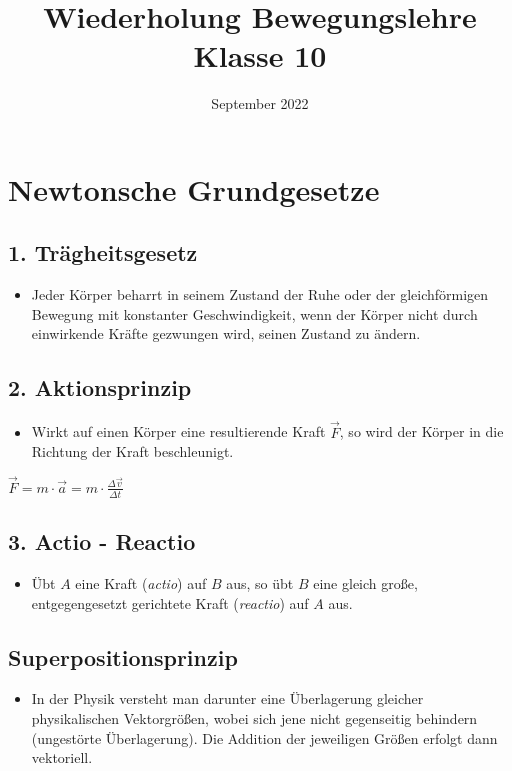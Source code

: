 \documentclass{article}
\title{Wiederholung Bewegungslehre Klasse 10}
\author{September 2022}
\date{}
\begin{document}
\maketitle
\section*{Newtonsche Grundgesetze}
\subsection*{1. Trägheitsgesetz}
\begin{itemize}
	\item Jeder Körper beharrt in seinem Zustand der Ruhe oder der gleichförmigen Bewegung mit konstanter Geschwindigkeit, wenn der Körper nicht durch einwirkende Kräfte gezwungen wird, seinen Zustand zu ändern.	
\end{itemize}
\subsection*{2. Aktionsprinzip}
\begin{itemize}
	\item Wirkt auf einen Körper eine resultierende Kraft $\vec{F}$, so wird der Körper in die Richtung der Kraft beschleunigt.
\end{itemize}
\begin{center}
	$\vec{F} = m \cdot \vec{a} = m \cdot \frac{\Delta \vec{v}}{\Delta t}$
\end{center}
\subsection*{3. Actio - Reactio}
\begin{itemize}
	\item Übt $A$ eine Kraft (\textit{actio}) auf $B$ aus, so übt $B$ eine gleich große, entgegengesetzt gerichtete Kraft (\textit{reactio}) auf $A$ aus.
\end{itemize}
\subsection*{Superpositionsprinzip}
\begin{itemize}
	\item In der Physik versteht man darunter eine Überlagerung gleicher physikalischen Vektorgrößen, wobei sich jene nicht gegenseitig behindern (ungestörte Überlagerung). Die Addition der jeweiligen Größen erfolgt dann vektoriell.
\end{itemize}
\end{document}

